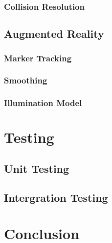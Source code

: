 \documentclass{cmppgr}
\begin{document}
\subsubsection{Collision Resolution}

\subsection{Augmented Reality}
\subsubsection{Marker Tracking}
\subsubsection{Smoothing}
\subsubsection{Illumination Model}

\section{Testing}

\subsection{Unit Testing}

\subsection{Intergration Testing}

\section{Conclusion}




%

%
\end{document}
